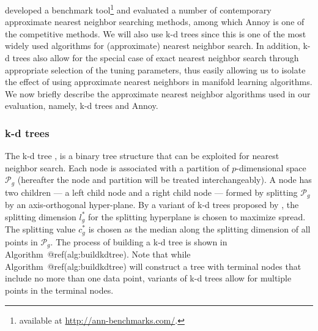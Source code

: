 \documentclass{article}
\begin{document}
\citet{Aumuller2020-nk} developed a benchmark tool\footnote{available at
  \url{http://ann-benchmarks.com/}.} and evaluated a number of
contemporary approximate nearest neighbor searching methods, among which
Annoy is one of the competitive methods. We will also use k-d trees
since this is one of the most widely used algorithms for (approximate)
nearest neighbor search. In addition, k-d trees also allow for the
special case of exact nearest neighbor search through appropriate
selection of the tuning parameters, thus easily allowing us to isolate
the effect of using approximate nearest neighbors in manifold learning
algorithms. We now briefly describe the approximate nearest neighbor
algorithms used in our evaluation, namely, k-d trees and Annoy.

\hypertarget{k-d-trees}{%
\subsubsection*{k-d trees}\label{k-d-trees}}

The k-d tree \citep{Bentley1975-zo}, is a binary tree structure that can
be exploited for nearest neighbor search. Each node is associated with a
partition of \(p\)-dimensional space \(\mathcal{P}_g\) (hereafter the
node and partition will be treated interchangeably). A node has two
children --- a left child node and a right child node --- formed by
splitting \(\mathcal{P}_g\) by an axis-orthogonal hyper-plane. By a
variant of k-d trees proposed by \citet{Friedman1977-dh}, the splitting
dimension \(l_g^*\) for the splitting hyperplane is chosen to maximize
spread. The splitting value \(c_g^*\) is chosen as the median along the
splitting dimension of all points in \(\mathcal{P}_g\). The process of
building a k-d tree is shown in Algorithm~@ref(alg:buildkdtree). Note
that while Algorithm~@ref(alg:buildkdtree) will construct a tree with
terminal nodes that include no more than one data point, variants of k-d
trees allow for multiple points in the terminal nodes.
\end{document}
